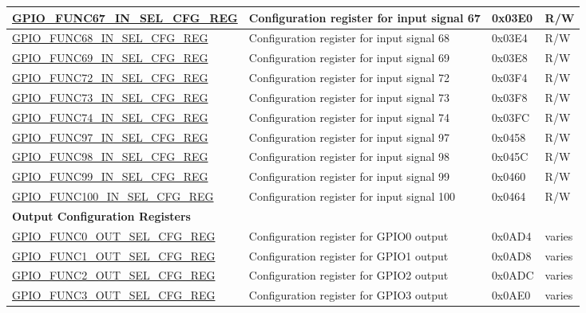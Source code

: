 \begin{longtable}{ | p{5.5cm} | p{6.2cm} | p{1.3cm} | p{2cm} | }
\hyperref[regdesc:GPIOFUNCRINSELCFGREG]{GPIO\_FUNC67\_IN\_SEL\_CFG\_REG} & Configuration register for input signal 67 & 0x03E0 & R/W \\ \hline
\hyperref[regdesc:GPIOFUNCRINSELCFGREG]{GPIO\_FUNC68\_IN\_SEL\_CFG\_REG} & Configuration register for input signal 68 & 0x03E4 & R/W \\ \hline
\hyperref[regdesc:GPIOFUNCRINSELCFGREG]{GPIO\_FUNC69\_IN\_SEL\_CFG\_REG} & Configuration register for input signal 69 & 0x03E8 & R/W \\ \hline
\hyperref[regdesc:GPIOFUNCTINSELCFGREG]{GPIO\_FUNC72\_IN\_SEL\_CFG\_REG} & Configuration register for input signal 72 & 0x03F4 & R/W \\ \hline
\hyperref[regdesc:GPIOFUNCTINSELCFGREG]{GPIO\_FUNC73\_IN\_SEL\_CFG\_REG} & Configuration register for input signal 73 & 0x03F8 & R/W \\ \hline
\hyperref[regdesc:GPIOFUNCTINSELCFGREG]{GPIO\_FUNC74\_IN\_SEL\_CFG\_REG} & Configuration register for input signal 74 & 0x03FC & R/W \\ \hline
\hyperref[regdesc:GPIOFUNCUINSELCFGREG]{GPIO\_FUNC97\_IN\_SEL\_CFG\_REG} & Configuration register for input signal 97 & 0x0458 & R/W \\ \hline
\hyperref[regdesc:GPIOFUNCUINSELCFGREG]{GPIO\_FUNC98\_IN\_SEL\_CFG\_REG} & Configuration register for input signal 98 & 0x045C & R/W \\ \hline
\hyperref[regdesc:GPIOFUNCUINSELCFGREG]{GPIO\_FUNC99\_IN\_SEL\_CFG\_REG} & Configuration register for input signal 99 & 0x0460 & R/W \\ \hline
\hyperref[regdesc:GPIOFUNCUINSELCFGREG]{GPIO\_FUNC100\_IN\_SEL\_CFG\_REG} & Configuration register for input signal 100 & 0x0464 & R/W \\ \hline
\multicolumn{4}{|l|}{\textbf{Output Configuration Registers}} \\ \hline
\hyperref[regdesc:GPIOFUNCNOUTSELCFGREG]{GPIO\_FUNC0\_OUT\_SEL\_CFG\_REG} & Configuration register for GPIO0 output & 0x0AD4 & varies \\ \hline
\hyperref[regdesc:GPIOFUNCNOUTSELCFGREG]{GPIO\_FUNC1\_OUT\_SEL\_CFG\_REG} & Configuration register for GPIO1 output & 0x0AD8 & varies \\ \hline
\hyperref[regdesc:GPIOFUNCNOUTSELCFGREG]{GPIO\_FUNC2\_OUT\_SEL\_CFG\_REG} & Configuration register for GPIO2 output & 0x0ADC & varies \\ \hline
\hyperref[regdesc:GPIOFUNCNOUTSELCFGREG]{GPIO\_FUNC3\_OUT\_SEL\_CFG\_REG} & Configuration register for GPIO3 output & 0x0AE0 & varies \\ \hline

\end{longtable}

